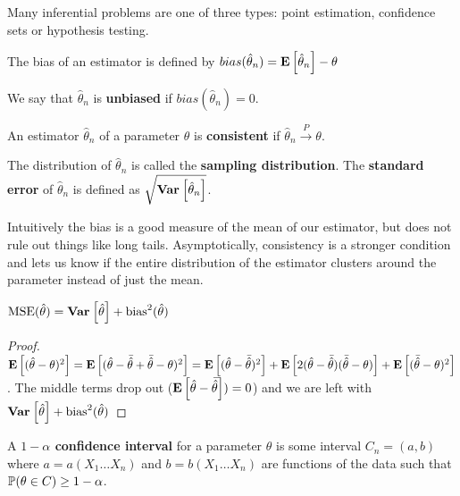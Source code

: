 \documentclass[10pt]{article}
\begin{document}
Many inferential problems are one of three types: point estimation, confidence
sets or hypothesis testing.

\begin{definition}
    The bias of an estimator is defined by $bias(\hat{\theta}_n) = \E{\hat{\theta}_n} - \theta$
\end{definition}

We say that $\hat{\theta}_n$ is \textbf{unbiased} if $bias(\hat{\theta}_n) = 0$.

\begin{definition}
    An estimator $\hat{\theta}_n$ of a parameter $\theta$ is \textbf{consistent} if
    $\hat{\theta}_n \xrightarrow{P} \theta$.
\end{definition}

\begin{definition}
    The distribution of $\hat{\theta}_n$ is called the \textbf{sampling distribution}.
    The \textbf{standard error} of $\hat{\theta}_n$ is defined as $\sqrt{\Var{\hat{\theta}_n}}$.
\end{definition}

Intuitively the bias is a good measure of the mean of our estimator, but does
not rule out things like long tails. Asymptotically, consistency is a stronger
condition and lets us know if the entire distribution of the estimator clusters
around the parameter instead of just the mean.

\begin{theorem}
    $\operatorname{MSE}(\hat{\theta}) = \Var{\hat{\theta}} + \operatorname{bias}^2({\hat{\theta}})$
\end{theorem}

\begin{proof}
    $\E{(\hat{\theta} - \theta)^2} = \E{(\hat{\theta} - \bar{\hat{\theta}} +
    \bar{\hat{\theta}} - \theta)^2} = \E{(\hat{\theta} - \bar{\hat{\theta}})^2}
    + \E{2(\hat{\theta} - \bar{\hat{\theta}})(\bar{\hat{\theta}} - \theta)}
    + \E{(\bar{\hat{\theta}} - \theta)^2}$. The middle terms drop out
    ($\E{\hat{\theta} - \bar{\hat{\theta}}}) = 0$) and we
    are left with $\Var{\hat{\theta}} + \operatorname{bias}^2(\hat{\theta})$
\end{proof}

\begin{definition}
    A \textbf{$1-\alpha$ confidence interval} for a parameter $\theta$ is some interval
    $C_n = (a, b)$ where $a = a(X_1 \dots X_n)$ and $b = b(X_1 \dots X_n)$ are
    functions of the data such that $\P(\theta \in C) \geq 1-\alpha$.
\end{definition}
\end{document}
